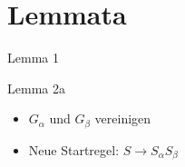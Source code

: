\section{Lemmata}

\begin{frame}{\FrameName}
\begin{block}{Lemma 1}
  \begin{center}
  \end{center}
  \begin{center}
  \end{center}
  
\end{block}
\end{frame}

\begin{frame}{\FrameName}
\begin{block}{Lemma 2a}
  \begin{center}
  \end{center}
  \begin{itemize}
    \item<2-> $G_\alpha$ und $G_\beta$ vereinigen
    \item<3-> Neue Startregel: $S \rightarrow S_\alpha S_\beta$
  \end{itemize}
  
\end{block}
\end{frame}


